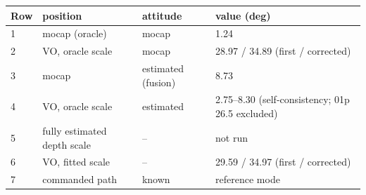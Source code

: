 \begin{tabular}{llll}
\toprule
Row & position & attitude & value (deg) \\
\midrule
1 & mocap (oracle) & mocap & 1.24 \\
2 & VO, oracle scale & mocap & 28.97 / 34.89 (first / corrected) \\
3 & mocap & estimated (fusion) & 8.73 \\
4 & VO, oracle scale & estimated & 2.75--8.30 (self-consistency; 01p 26.5 excluded) \\
5 & fully estimated depth scale & -- & not run \\
6 & VO, fitted scale & -- & 29.59 / 34.97 (first / corrected) \\
7 & commanded path & known & reference mode \\
\bottomrule
\end{tabular}
